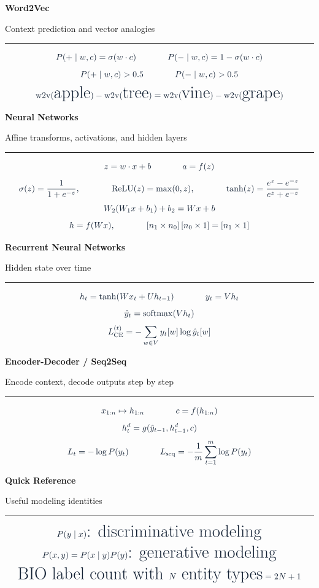 \documentclass[12pt,fleqn]{article}
\newcommand{\cardtitle}[1]{{\fontsize{22}{24}\selectfont\bfseries\color{cardink} #1\par}}
\newcommand{\cardsub}[1]{{\large\color{cardmuted} #1\par}}
\newcommand{\ruleline}{\par\noindent\color{cardrule}\rule{\textwidth}{1.1pt}\par\vspace{0.85em}}
\newcommand{\eqline}[1]{\[
{\color{cardink}\fontsize{20}{26}\selectfont\displaystyle #1}
\]}
\begin{document}
\cardtitle{Word2Vec}
\cardsub{Context prediction and vector analogies}
\ruleline
\eqline{P(+ \mid w, c) = \sigma(w \cdot c) \qquad P(- \mid w, c) = 1 - \sigma(w \cdot c)}
\eqline{P(+ \mid w, c) > 0.5 \qquad P(- \mid w, c) > 0.5}
\eqline{\operatorname{w2v}(\text{apple}) - \operatorname{w2v}(\text{tree}) = \operatorname{w2v}(\text{vine}) - \operatorname{w2v}(\text{grape})}
\newpage

\cardtitle{Neural Networks}
\cardsub{Affine transforms, activations, and hidden layers}
\ruleline
\eqline{z = w \cdot x + b \qquad a = f(z)}
\eqline{\sigma(z) = \frac{1}{1+e^{-z}}, \qquad \operatorname{ReLU}(z) = \max(0, z), \qquad \tanh(z) = \frac{e^z - e^{-z}}{e^z + e^{-z}}}
\eqline{W_2(W_1x + b_1) + b_2 = Wx + b}
\eqline{h = f(Wx), \qquad [n_1 \times n_0]\,[n_0 \times 1] = [n_1 \times 1]}
\newpage

\cardtitle{Recurrent Neural Networks}
\cardsub{Hidden state over time}
\ruleline
\eqline{h_t = \tanh(Wx_t + Uh_{t-1}) \qquad y_t = Vh_t}
\eqline{\hat{y}_t = \operatorname{softmax}(Vh_t)}
\eqline{L_{\text{CE}}^{(t)} = -\sum_{w \in V} y_t[w]\log \hat{y}_t[w]}
\newpage

\cardtitle{Encoder-Decoder / Seq2Seq}
\cardsub{Encode context, decode outputs step by step}
\ruleline
\eqline{x_{1:n} \mapsto h_{1:n} \qquad c = f(h_{1:n})}
\eqline{h_t^{d} = g(\hat{y}_{t-1}, h_{t-1}^{d}, c)}
\eqline{L_t = -\log P(y_t) \qquad L_{\text{seq}} = -\frac{1}{m}\sum_{t=1}^{m}\log P(y_t)}
\newpage

\cardtitle{Quick Reference}
\cardsub{Useful modeling identities}
\ruleline
\eqline{P(y \mid x) \text{: discriminative modeling}}
\eqline{P(x, y) = P(x \mid y)P(y) \text{: generative modeling}}
\eqline{\text{BIO label count with }N\text{ entity types} = 2N + 1}
\end{document}
